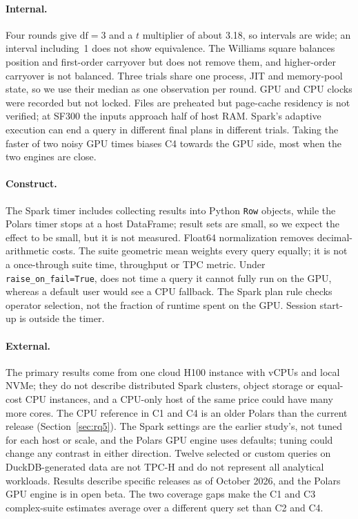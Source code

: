 \documentclass[sigconf, nonacm]{acmart}
\begin{document}
\paragraph{Internal.} Four rounds give $\text{df}=3$ and a $t$ multiplier of
about 3.18, so intervals are wide; an interval including~1 does not show
equivalence. The Williams square balances position and first-order carryover
but does not remove them, and higher-order carryover is not balanced. Three
trials share one process, JIT and memory-pool state, so we use their median as
one observation per round. GPU and CPU clocks were recorded but not locked.
Files are preheated but page-cache residency is not verified; at SF300 the
inputs approach half of host RAM. Spark's adaptive execution can end a query in
different final plans in different trials. Taking the faster of two noisy GPU
times biases C4 towards the GPU side, most when the two engines are close.

\paragraph{Construct.} The Spark timer includes collecting results into Python
\texttt{Row} objects, while the Polars timer stops at a host DataFrame; result
sets are small, so we expect the effect to be small, but it is not measured.
Float64 normalization removes decimal-arithmetic costs. The suite geometric
mean weights every query equally; it is not a once-through suite time,
throughput or TPC metric. Under \texttt{raise\_on\_fail=True}, \polarsgpu{} does
not time a query it cannot fully run on the GPU, whereas a default user would
see a CPU fallback. The Spark plan rule checks operator selection, not the
fraction of runtime spent on the GPU. Session start-up is outside the timer.

\paragraph{External.} The primary results come from one cloud H100 instance
with  vCPUs and local NVMe; they do not describe distributed
Spark clusters, object storage or equal-cost CPU instances, and a CPU-only host
of the same price could have many more cores. The CPU reference in C1 and C4 is
an older Polars than the current release (Section~\ref{sec:rq5}). The Spark
settings are the earlier study's, not tuned for each host or scale, and the
Polars GPU engine uses defaults; tuning could change any contrast in either
direction. Twelve selected or custom queries on DuckDB-generated data are not
TPC-H and do not represent all analytical workloads. Results describe specific
releases as of October 2026, and the Polars GPU engine is in open beta. The two
coverage gaps make the C1 and C3 complex-suite estimates average over a
different query set than C2 and C4.
\end{document}
